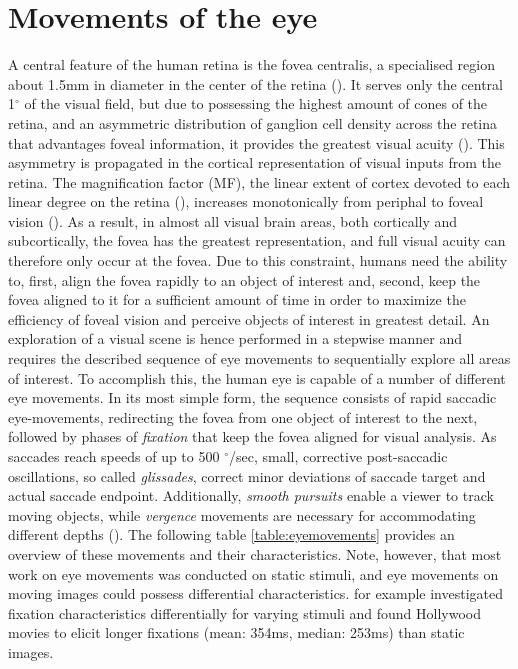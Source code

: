 \documentclass[a4paper, 12pt]{scrreprt}
\begin{document}
\section{Movements of the eye}\label{section:eyemoves}
A central feature of the human retina is the fovea centralis, a specialised region about 1.5mm in diameter in the center of the retina (\cite{benninghof2004anat}). It serves only the central 1$^\circ$ of the visual field, but due to possessing the highest amount of cones of the retina, and an asymmetric distribution of ganglion cell density across the retina that advantages foveal information, it provides the greatest visual acuity (\cite{perry1986ganglion}). This asymmetry is propagated in the cortical representation of visual inputs from the retina. The magnification factor (MF), the linear extent of cortex devoted to each linear degree on the retina (\cite{daniel1961representation}), increases monotonically from periphal to foveal vision (\cite{daniel1961representation}). As a result, in almost all visual brain areas, both cortically and subcortically, the fovea has the greatest representation, and full visual acuity can therefore only occur at the fovea. 
Due to this constraint, humans need the ability to, first, align the fovea rapidly to an object of interest and, second, keep the fovea aligned to it for a sufficient amount of time in order to maximize the efficiency of foveal vision and perceive objects of interest in greatest detail. An exploration of a visual scene is hence performed in a stepwise manner and requires the described sequence of eye movements to sequentially explore all areas of interest. To accomplish this, the human eye is capable of a number of different eye movements. In its most simple form, the sequence consists of rapid saccadic eye-movements, redirecting the fovea from one object of interest to the next, followed by phases of \textit{fixation} that keep the fovea aligned for visual analysis. As saccades reach speeds of up to 500 $^\circ$/sec, small, corrective post-saccadic oscillations, so called \textit{glissades}, correct minor deviations of saccade target and actual saccade endpoint. Additionally, \textit{smooth pursuits} enable a viewer to track moving objects, while \textit{vergence} movements are necessary for accommodating different depths (\cite{holmqvist2011eye}). The following table \ref{table:eyemovements} provides an overview of these movements and their characteristics. Note, however, that most work on eye movements was conducted on static stimuli, and eye movements on moving images could possess differential characteristics. \textcite{dorr2010variability} for example investigated fixation characteristics differentially for varying stimuli and found Hollywood movies to elicit longer fixations (mean: 354ms, median: 253ms) than static images. \newline
  
\end{document}
